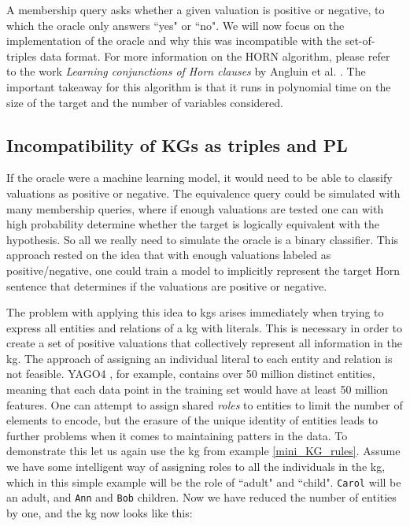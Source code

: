 A membership query asks whether a given valuation is positive or negative, to which the oracle only answers ``yes" or ``no". We will now focus on the implementation of the oracle and why this was incompatible with the set-of-triples data format. For more information on the HORN algorithm, please refer to the work \textit{Learning conjunctions of Horn clauses} by Angluin et al. \cite{DBLP:journals/ml/AngluinFP92}. The important takeaway for this algorithm is that it runs in polynomial time on the size of the target and the number of variables considered.


\subsection{Incompatibility of KGs as triples and PL}
If the oracle were a machine learning model, it would need to be able to classify valuations as positive or negative. The equivalence query could be simulated with many membership queries, where if enough valuations are tested one can with high probability determine whether the target is logically equivalent with the hypothesis. So all we really need to simulate the oracle is a binary classifier. This approach rested on the idea that with enough valuations labeled as positive/negative, one could train a model to implicitly represent the target Horn sentence that determines if the valuations are positive or negative. 

The problem with applying this idea to \glspl{kg} arises immediately when trying to express all entities and relations of a \gls{kg} with literals. This is necessary in order to create a set of positive valuations that collectively represent all information in the \gls{kg}. The approach of assigning an individual literal to each entity and relation is not feasible. YAGO4 \cite{yago4}, for example, contains over 50 million distinct entities, meaning that each data point in the training set would have at least 50 million features. One can attempt to assign shared \textit{roles} to entities to limit the number of elements to encode, but the erasure of the unique identity of entities leads to further problems when it comes to maintaining patters in the data. To demonstrate this let us again use the \gls{kg} from example \ref{mini_KG_rules}. Assume we have some intelligent way of assigning roles to all the individuals in the \gls{kg}, which in this simple example will be the role of ``adult" and ``child". \texttt{Carol} will be an adult, and \texttt{Ann} and \texttt{Bob} children. Now we have reduced the number of entities by one, and the \gls{kg} now looks like this:


